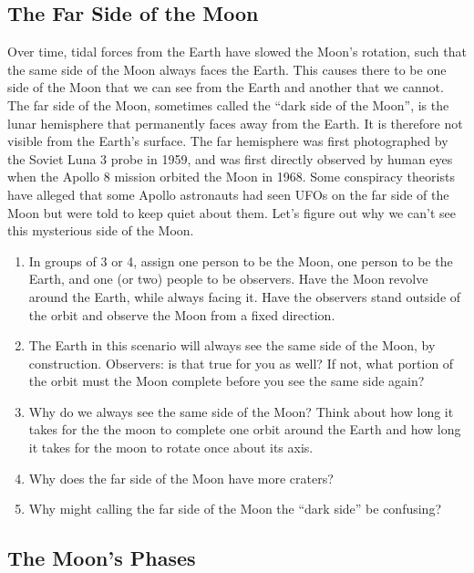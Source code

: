 \documentclass[12pt]{article}%
\begin{document}
\subsection{The Far Side of the Moon}
Over time, tidal forces from the Earth have slowed the Moon's rotation, such that the same side of the Moon always faces the Earth. This causes there to be one side of the Moon that we can see from the Earth and another that we cannot.
The far side of the Moon, sometimes called the ``dark side of the Moon'', is the lunar hemisphere that permanently faces away from the Earth. 
It is therefore not visible from the Earth's surface. 
The far hemisphere was first photographed by the Soviet Luna 3 probe in 1959, and was first directly observed by human eyes when the Apollo 8 mission orbited the Moon in 1968.
Some conspiracy theorists have alleged that some Apollo astronauts had seen UFOs on the far side of the Moon but were told to keep quiet about them. 
Let's figure out why we can't see this mysterious side of the Moon.
\begin{enumerate}
    \item In groups of 3 or 4, assign one person to be the Moon, one person to be the Earth, and one (or two) people to be observers. 
    Have the Moon revolve around the Earth, while always facing it. 
    Have the observers stand outside of the orbit and observe the Moon from a fixed direction. 
    \item The Earth in this scenario will always see the same side of the Moon, by construction. 
    Observers: is that true for you as well?
    If not, what portion of the orbit must the Moon complete before you see the same side again? 
    \item Why do we always see the same side of the Moon? 
    Think about how long it takes for the the moon to complete one orbit around the Earth and how long it takes for the moon to rotate once about its axis. 
    \item Why does the far side of the Moon have more craters?
    \item Why might calling the far side of the Moon the ``dark side'' be confusing?
\end{enumerate}

\vspace{7cm}


\subsection{The Moon's Phases}
\end{document}
